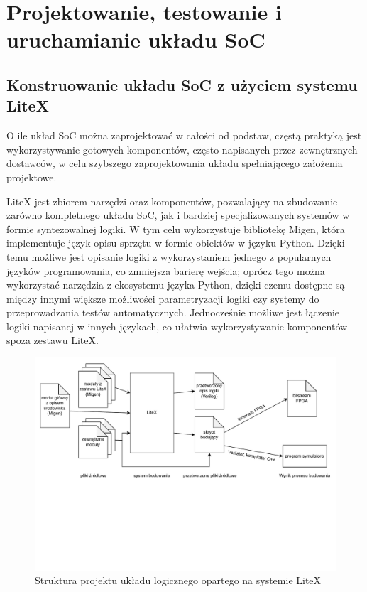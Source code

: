 \section{Projektowanie, testowanie i uruchamianie układu SoC}

\subsection{Konstruowanie układu SoC z użyciem systemu LiteX}

O ile układ SoC można zaprojektować w całości od podstaw, częstą praktyką jest wykorzystywanie gotowych komponentów, często napisanych przez zewnętrznych dostawców, w celu szybszego zaprojektowania układu spełniającego założenia projektowe.

LiteX\cite{https://doi.org/10.48550/arxiv.2005.02506} jest zbiorem narzędzi oraz komponentów, pozwalający na zbudowanie zarówno kompletnego układu SoC, jak i bardziej specjalizowanych systemów w formie syntezowalnej logiki. W tym celu wykorzystuje bibliotekę Migen\cite{migen:2016:Online}, która implementuje język opisu sprzętu w formie obiektów w języku Python\cite{10.5555/1593511}. Dzięki temu możliwe jest opisanie logiki z wykorzystaniem jednego z popularnych języków programowania, co zmniejsza barierę wejścia; oprócz tego można wykorzystać narzędzia z ekosystemu języka Python, dzięki czemu dostępne są między innymi większe możliwości parametryzacji logiki czy systemy do przeprowadzania testów automatycznych. Jednocześnie możliwe jest łączenie logiki napisanej w innych językach, co ułatwia wykorzystywanie komponentów spoza zestawu LiteX.

\begin{figure}[H]
\centering
\includegraphics[scale=0.7,trim={0 6cm 0 0.3cm},clip]{tooling/diag-litex.pdf}
\caption{Struktura projektu układu logicznego opartego na systemie LiteX}
\label{fig:litex-project-schem}
\end{figure}

